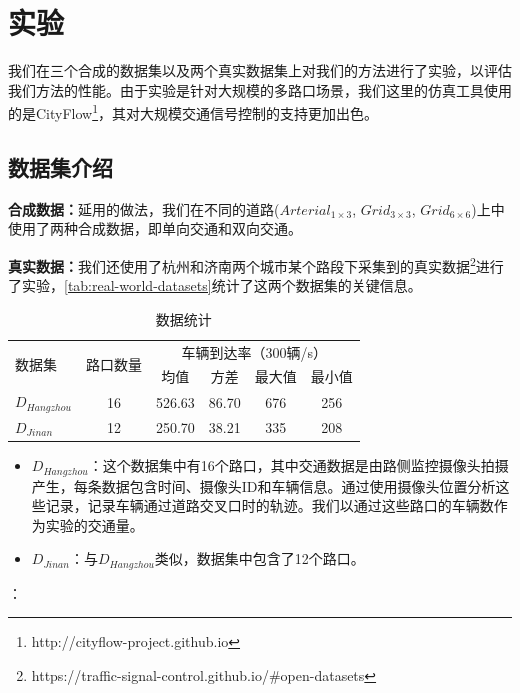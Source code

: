 \section{实验}
我们在三个合成的数据集以及两个真实数据集上对我们的方法进行了实验，以评估我们方法的性能。由于实验是针对大规模的多路口场景，我们这里的仿真工具使用的是CityFlow\footnote{http://cityflow-project.github.io}，其对大规模交通信号控制的支持更加出色。
\subsection{数据集介绍}

\textbf{合成数据：}延用的做法，我们在不同的道路($Arterial_{1\times3}$, $Grid_{3\times3}$, $Grid_{6\times6}$)上中使用了两种合成数据，即单向交通和双向交通。

\textbf{真实数据：}我们还使用了杭州和济南两个城市某个路段下采集到的真实数据\footnote{https://traffic-signal-control.github.io/\#open-datasets}进行了实验，\autoref{tab:real-world-datasets}统计了这两个数据集的关键信息。
\begin{table}[htb]
  \caption{数据统计}
  \label{tab:real-world-datasets}
  \begin{tabular}{lccccc}
  \toprule
  \multirow{2}{*}{数据集} & \multirow{2}{*}{路口数量} & \multicolumn{4}{c}{车辆到达率（300辆/s）} \\
  & & \multicolumn{1}{c}{均值} & \multicolumn{1}{c}{方差} & \multicolumn{1}{c}{最大值} & \multicolumn{1}{c}{最小值} \\
  \midrule
  $D_{Hangzhou}$ & 16 & 526.63 & 86.70 & 676 & 256 \\
  $D_{Jinan}$ & 12 & 250.70 & 38.21 & 335 & 208 \\
  \bottomrule
  \end{tabular}
\end{table}
\begin{itemize}
  \item $D_{Hangzhou}$：这个数据集中有16个路口，其中交通数据是由路侧监控摄像头拍摄产生，每条数据包含时间、摄像头ID和车辆信息。通过使用摄像头位置分析这些记录，记录车辆通过道路交叉口时的轨迹。我们以通过这些路口的车辆数作为实验的交通量。
  \item $D_{Jinan}$：与$D_{Hangzhou}$类似，数据集中包含了12个路口。
\end{itemize}：

